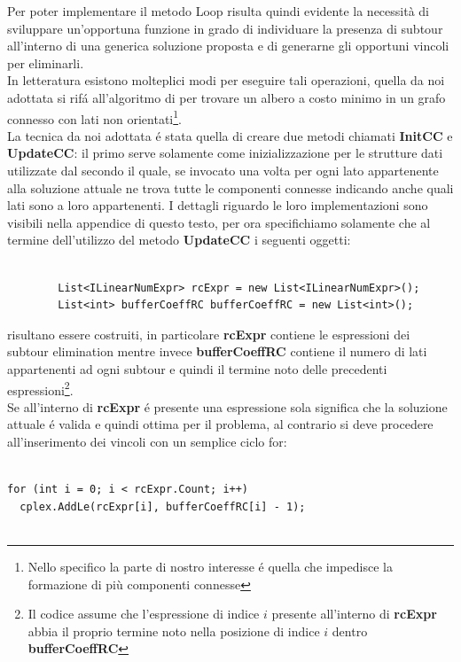 \documentclass[11pt]{article}
\begin{document}
Per poter implementare il metodo Loop risulta quindi evidente la necessit\`a di sviluppare un'opportuna funzione in grado di individuare la presenza di subtour all'interno di una generica soluzione proposta e di generarne gli opportuni vincoli per eliminarli.\\
In letteratura esistono molteplici modi per eseguire tali operazioni, quella da noi adottata si rif\'a all'algoritmo di  per trovare un albero a costo minimo in un grafo connesso con lati non orientati\footnote{Nello specifico la parte di nostro interesse \'e quella che impedisce la formazione di più componenti connesse}.\\
La tecnica da noi adottata \'e stata quella di creare due metodi chiamati \textbf{InitCC} e \textbf{UpdateCC}: il primo serve solamente come inizializzazione per le strutture dati utilizzate dal secondo il quale, se invocato una volta per ogni lato appartenente alla soluzione attuale ne trova tutte le componenti connesse indicando anche quali lati sono a loro appartenenti. I dettagli riguardo le loro implementazioni sono visibili nella appendice di questo testo, per ora specifichiamo solamente che al termine dell'utilizzo del metodo \textbf{UpdateCC} i seguenti oggetti:

\begin{lstlisting}

        List<ILinearNumExpr> rcExpr = new List<ILinearNumExpr>();
        List<int> bufferCoeffRC bufferCoeffRC = new List<int>();

\end{lstlisting}

risultano essere costruiti, in particolare \textbf{rcExpr} contiene le espressioni dei subtour elimination mentre invece \textbf{bufferCoeffRC} contiene il numero di lati appartenenti ad ogni subtour e quindi il termine noto delle precedenti espressioni\footnote{Il codice assume che l'espressione di indice $i$ presente all'interno di \textbf{rcExpr} abbia il proprio termine noto nella posizione di indice $i$ dentro \textbf{bufferCoeffRC}}.\\
Se all'interno di \textbf{rcExpr} \'e presente una espressione sola significa che la soluzione attuale \'e valida e quindi ottima per il problema, al contrario si deve procedere all'inserimento dei vincoli con un semplice ciclo for:

\begin{lstlisting}
                
for (int i = 0; i < rcExpr.Count; i++)
  cplex.AddLe(rcExpr[i], bufferCoeffRC[i] - 1);
              
\end{lstlisting}
\end{document}
